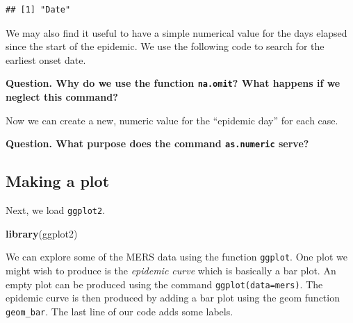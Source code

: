 \documentclass[]{article}
\newenvironment{Shaded}{\begin{snugshade}}{\end{snugshade}}
\newcommand{\KeywordTok}[1]{\textcolor[rgb]{0.13,0.29,0.53}{\textbf{#1}}}
\newcommand{\StringTok}[1]{\textcolor[rgb]{0.31,0.60,0.02}{#1}}
\newcommand{\OperatorTok}[1]{\textcolor[rgb]{0.81,0.36,0.00}{\textbf{#1}}}
\newcommand{\NormalTok}[1]{#1}
\begin{document}
\begin{verbatim}
## [1] "Date"
\end{verbatim}

We may also find it useful to have a simple numerical value for the days
elapsed since the start of the epidemic. We use the following code to
search for the earliest onset date.

\begin{Shaded}
\end{Shaded}

\textbf{Question. Why do we use the function \texttt{na.omit}? What
happens if we neglect this command?}

Now we can create a new, numeric value for the ``epidemic day'' for each
case.

\begin{Shaded}
\end{Shaded}

\textbf{Question. What purpose does the command \texttt{as.numeric}
serve?}

\hypertarget{making-a-plot}{%
\subsection{Making a plot}\label{making-a-plot}}

Next, we load \texttt{ggplot2}.

\begin{Shaded}
\begin{Highlighting}[]
\KeywordTok{library}\NormalTok{(ggplot2)}
\end{Highlighting}
\end{Shaded}

We can explore some of the MERS data using the function \texttt{ggplot}.
One plot we might wish to produce is the \emph{epidemic curve} which is
basically a bar plot. An empty plot can be produced using the command
\texttt{ggplot(data=mers)}. The epidemic curve is then produced by
adding a bar plot using the geom function \texttt{geom\_bar}. The last
line of our code adds some labels.
\end{document}
